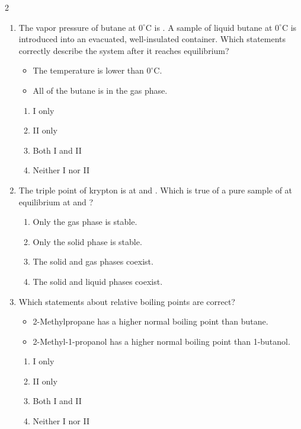 \documentclass[10pt,letterpaper]{article}
\begin{document}
\begin{multicols*}{2}
\begin{enumerate}
    \item The vapor pressure of butane at $0^\circ\text{C}$ is . A  sample of liquid butane at $0^\circ\text{C}$ is introduced into an evacuated, well-insulated  container. Which statements correctly describe the system after it reaches equilibrium?
    \begin{itemize}
        \item[I.] The temperature is lower than $0^\circ\text{C}$.
        \item[II.] All of the butane is in the gas phase.
    \end{itemize}
    \begin{enumerate}[label=(\textsubscript{\Alph*})]
        \item I only
        \item II only
        \item Both I and II
        \item Neither I nor II
    \end{enumerate}

    \item The triple point of krypton is at  and . Which is true of a pure sample of  at equilibrium at  and ?
    \begin{enumerate}[label=(\textsubscript{\Alph*})]
        \item Only the gas phase is stable.
        \item Only the solid phase is stable.
        \item The solid and gas phases coexist.
        \item The solid and liquid phases coexist.
    \end{enumerate}

    \item Which statements about relative boiling points are correct?
    \begin{itemize}
        \item[I.] 2-Methylpropane has a higher normal boiling point than butane.
        \item[II.] 2-Methyl-1-propanol has a higher normal boiling point than 1-butanol.
    \end{itemize}
    \begin{enumerate}[label=(\textsubscript{\Alph*})]
        \item I only
        \item II only
        \item Both I and II
        \item Neither I nor II
    \end{enumerate}


\end{enumerate}
\end{multicols*}
\end{document}
